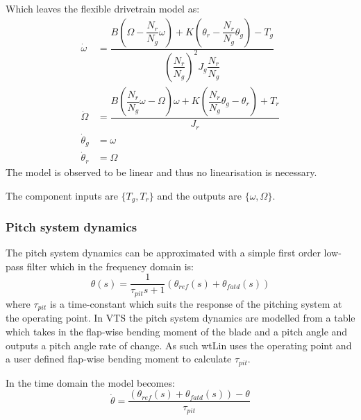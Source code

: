 Which leaves the flexible drivetrain model as:
\begin{align} 
	\dot{\omega} & = \dfrac{B \left(\Omega - \dfrac{N_r}{N_g}\omega\right) + K\left(\theta_r - \dfrac{N_r}{N_g} \theta_{g}\right) - T_{g}}{\left(\dfrac{N_r}{N_g}\right)^2 J_{g} \dfrac{N_r}{N_g} } \label{eq:comp_comp_drivetrain_flex_mod_1} \\
	\dot{\Omega} & = \dfrac{B \left(\dfrac{N_r}{N_g}\omega - \Omega \right) \omega + K\left(\dfrac{N_r}{N_g} \theta_{g} - \theta_r\right) + T_{r}}{J_{r}} \label{eq:comp_comp_drivetrain_flex_mod_2} \\
	\dot{\theta}_g & = \omega \\
	\dot{\theta}_r & = \Omega
\end{align}
The model is observed to be linear and thus no linearisation is necessary.

The component inputs are $ \{T_g, T_r\} $ and the outputs are $ \{\omega, \Omega\} $. 

\subsubsection{Pitch system dynamics} \label{sec:comp_pitch_dyn}
The pitch system dynamics can be approximated with a simple first order low-pass filter which in the frequency domain is:
\begin{equation}\label{eq:comp_pitch_freq_dyn}
	\theta(s) = \dfrac{1}{\tau_{pit} s + 1} (\theta_{ref}(s) + \theta_{fatd}(s))
\end{equation}
where $ \tau_{pit} $ is a time-constant which suits the response of the pitching system at the operating point. In VTS the pitch system dynamics are modelled from a table which takes in the flap-wise bending moment of the blade and a pitch angle and outputs a pitch angle rate of change. As such wtLin uses the operating point and a user defined flap-wise bending moment to calculate $ \tau_{pit} $.

In the time domain the model becomes:
\begin{equation}\label{eq:comp_pitch_time}
	\dot{\theta} =\dfrac{(\theta_{ref}(s) + \theta_{fatd}(s)) - \theta}{\tau_{pit}}
\end{equation}

